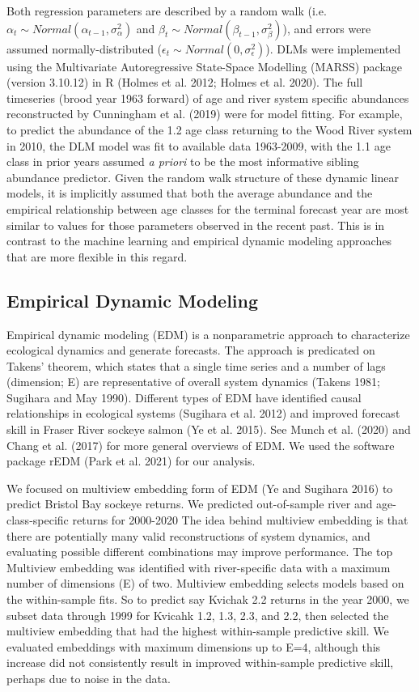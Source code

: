 \documentclass[
]{article}
\begin{document}
Both regression parameters are described by a random walk (i.e.~\(\alpha_t \sim Normal(\alpha_{t-1},\sigma^2_{\alpha})\) and \(\beta_t \sim Normal(\beta_{t-1},\sigma^2_{\beta})\)), and errors were assumed normally-distributed (\(\epsilon_t \sim Normal(0,\sigma^2_{\epsilon})\)). DLMs were implemented using the Multivariate Autoregressive State-Space Modelling (MARSS) package (version 3.10.12) in R (Holmes et al. 2012; Holmes et al. 2020). The full timeseries (brood year 1963 forward) of age and river system specific abundances reconstructed by Cunningham et al. (2019) were for model fitting. For example, to predict the abundance of the 1.2 age class returning to the Wood River system in 2010, the DLM model was fit to available data 1963-2009, with the 1.1 age class in prior years assumed \emph{a priori} to be the most informative sibling abundance predictor. Given the random walk structure of these dynamic linear models, it is implicitly assumed that both the average abundance and the empirical relationship between age classes for the terminal forecast year are most similar to values for those parameters observed in the recent past. This is in contrast to the machine learning and empirical dynamic modeling approaches that are more flexible in this regard.

\hypertarget{empirical-dynamic-modeling}{%
\subsection{Empirical Dynamic Modeling}\label{empirical-dynamic-modeling}}

Empirical dynamic modeling (EDM) is a nonparametric approach to characterize ecological dynamics and generate forecasts. The approach is predicated on Takens' theorem, which states that a single time series and a number of lags (dimension; E) are representative of overall system dynamics (Takens 1981; Sugihara and May 1990). Different types of EDM have identified causal relationships in ecological systems (Sugihara et al. 2012) and improved forecast skill in Fraser River sockeye salmon (Ye et al. 2015). See Munch et al. (2020) and Chang et al. (2017) for more general overviews of EDM. We used the software package rEDM (Park et al. 2021) for our analysis.

We focused on multiview embedding form of EDM (Ye and Sugihara 2016) to predict Bristol Bay sockeye returns. We predicted out-of-sample river and age-class-specific returns for 2000-2020 The idea behind multiview embedding is that there are potentially many valid reconstructions of system dynamics, and evaluating possible different combinations may improve performance. The top Multiview embedding was identified with river-specific data with a maximum number of dimensions (E) of two. Multiview embedding selects models based on the within-sample fits. So to predict say Kvichak 2.2 returns in the year 2000, we subset data through 1999 for Kvicahk 1.2, 1.3, 2.3, and 2.2, then selected the multiview embedding that had the highest within-sample predictive skill. We evaluated embeddings with maximum dimensions up to E=4, although this increase did not consistently result in improved within-sample predictive skill, perhaps due to noise in the data.
\end{document}
